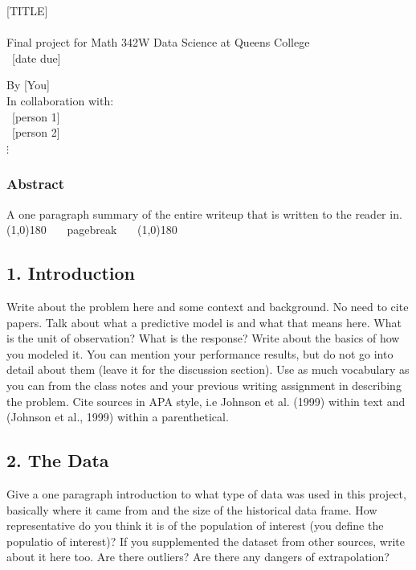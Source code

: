 \documentclass[12pt]{article}
\begin{document}
\begin{tcolorbox}

\begin{center}
[TITLE]\\~\\
\footnotesize Final project for Math 342W Data Science at Queens College\\
~[date due]~
\end{center}

\begin{flushright}
By [You]\\
In collaboration with:\\
~[person 1]~\\
~[person 2]~\\
$\vdots$~~~\\
\end{flushright}

\subsubsection*{Abstract}

A one paragraph summary of the entire writeup that is written to  the reader in.\\

\line(1,0){180} ~~~pagebreak~~~ \line(1,0){180}

\subsection*{1. Introduction}

Write about the problem here and some context and background. No need to cite papers. Talk about what a predictive model is and what that means here. What is the unit of observation? What is the response? Write about the basics of how you modeled it. You can mention your performance results, but do not go into detail about them (leave it for the discussion section). Use as much vocabulary as you can from the class notes and your previous writing assignment in describing the problem. Cite sources in APA style, i.e Johnson et al. (1999) within text and (Johnson et al., 1999) within a parenthetical.


\subsection*{2. The Data}

Give a one paragraph introduction to what type of data was used in this project, basically where it came from and the size of the historical data frame. How representative do you think it is of the population of interest (you define the populatio of interest)? If you supplemented the dataset from other sources, write about it here too. Are there outliers? Are there any dangers of extrapolation?



\end{tcolorbox}
\end{document}
